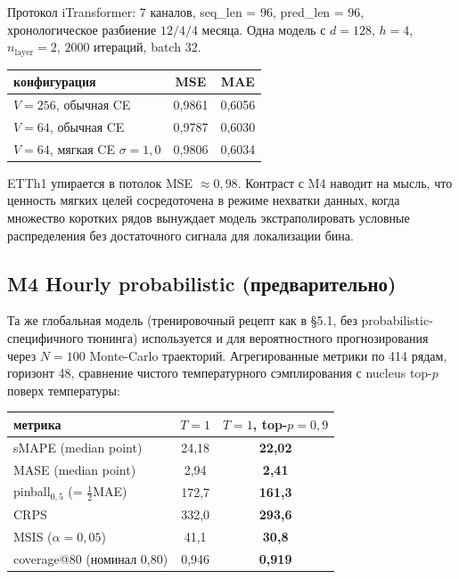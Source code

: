 \documentclass[11pt]{article}
\theoremstyle{remark}
\begin{document}
Протокол iTransformer: $7$ каналов, seq\_len = $96$, pred\_len = $96$,
хронологическое разбиение $12/4/4$ месяца. Одна модель с $d = 128$,
$h = 4$, $n_{\text{layer}} = 2$, $2000$ итераций, batch $32$.

\begin{center}
\begin{tabular}{lcc}
\toprule
конфигурация & MSE & MAE \\
\midrule
$V = 256$, обычная CE             & 0{,}9861 & 0{,}6056 \\
$V = 64$, обычная CE              & 0{,}9787 & 0{,}6030 \\
$V = 64$, мягкая CE $\sigma = 1{,}0$ & 0{,}9806 & 0{,}6034 \\
\bottomrule
\end{tabular}
\end{center}

ETTh1 упирается в потолок MSE $\approx 0{,}98$. Контраст с M4 наводит
на мысль, что ценность мягких целей сосредоточена в режиме нехватки
данных, когда множество коротких рядов вынуждает модель экстраполировать
условные распределения без достаточного сигнала для локализации бина.

\subsection{M4 Hourly probabilistic (предварительно)}
\label{sec:prob-m4}

Та же глобальная модель (тренировочный рецепт как в \S5.1, без
probabilistic-специфичного тюнинга) используется и для вероятностного
прогнозирования через $N = 100$ Monte-Carlo траекторий. Агрегированные
метрики по 414 рядам, горизонт 48, сравнение чистого температурного
сэмплирования с nucleus top-$p$ поверх температуры:

\begin{center}
\begin{tabular}{lcc}
\toprule
метрика & $T=1$ & $T=1$, top-$p=0{,}9$ \\
\midrule
sMAPE (median point) & 24{,}18 & \textbf{22{,}02} \\
MASE (median point) & 2{,}94 & \textbf{2{,}41} \\
pinball$_{0{,}5}$ (= $\tfrac{1}{2}$MAE) & 172{,}7 & \textbf{161{,}3} \\
CRPS & 332{,}0 & \textbf{293{,}6} \\
MSIS ($\alpha = 0{,}05$) & 41{,}1 & \textbf{30{,}8} \\
coverage@80 (номинал 0{,}80) & 0{,}946 & \textbf{0{,}919} \\
\bottomrule
\end{tabular}
\end{center}
\end{document}
